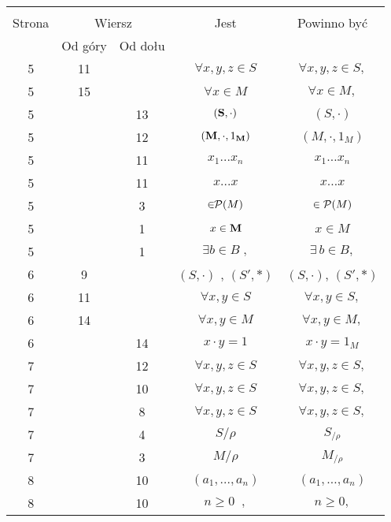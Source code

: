 \documentclass[a4paper,11pt]{article}
\begin{document}
\begin{center}

  \begin{tabular}{|c|c|c|c|c|}
    \hline
    & \multicolumn{2}{c|}{} & & \\
    Strona & \multicolumn{2}{c|}{Wiersz} & Jest
                              & Powinno być \\ \cline{2-3}
    & Od góry & Od dołu & & \\
    \hline
    5  & 11 & & $\forall x, y, z \in S$ & $\forall x, y, z \in S,$ \\
    5  & 15 & & $\forall x \in M$ & $\forall x \in M,$ \\
    5  & & 13 & $( \textrm{\textbf{S}}, \cdot )$ & $( S, \cdot )$ \\
    5  & & 12 & $( \textrm{\textbf{M}}, \cdot, 1_{ \textrm{\textbf{M}}} )$
           & $( M, \cdot, 1_{ M } )$ \\
    5 & & 11 & $x_{ 1 } ... x_{ n }$ & $x_{ 1 } \ldots x_{ n }$ \\
    5 & & 11 & $x ... x$ & $x \ldots x$ \\
    5 & &  3 & $\in \!\! \mathcal{P}( M )$ & $\in \mathcal{P}( M )$ \\
    5  & &  1 & $x \in \textrm{\textbf{M}}$ & $x \in M$ \\
    5  & &  1 & $\exists b \in B\; ,$ & $\exists \, b \in B,$ \\
    6  &  9 & & $( S, \cdot )${ }, { }{ }$( S', \ast )$
           & $( S, \cdot )$, $( S', \ast )$ \\
    6  & 11 & & $\forall x, y \in S$ & $\forall x, y \in S,$ \\
    6  & 14 & & $\forall x, y \in M$ & $\forall x, y \in M,$ \\
    6  & & 14 & $x \cdot y = 1$ & $x \cdot y = 1_{ M }$ \\
    7  & & 12 & $\forall x, y, z \in S$ & $\forall x, y, z \in S,$ \\
    7  & & 10 & $\forall x, y, z \in S$ & $\forall x, y, z \in S,$ \\
    7  & &  8 & $\forall x, y, z \in S$ & $\forall x, y, z \in S,$ \\
    7  & &  4 & $S / \rho$ & $S_{ / \rho }$ \\
    7  & &  3 & $M / \rho$ & $M_{ / \rho }$ \\
    8  & & 10 & $( a_{ 1 }, ..., a_{ n } )$ & $( a_{ 1 }, \ldots, a_{ n } )$ \\
    8  & & 10 & $n \geq 0\;\;,$ & $n \geq 0,$ \\

\end{tabular}
\end{center}
\end{document}
